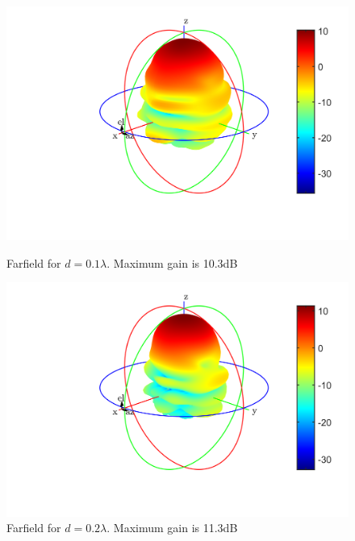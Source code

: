 \begin{figure}[H]
  \centering
  \begin{minipage}[b]{0.5\textwidth}
	\includegraphics[scale = 0.5]{figures/measurement/antennas/array_4_0p1.png}
	\caption{Farfield for $d = 0.1\lambda$. Maximum gain is 10.3dB}
    \label{fig:chamber_four_ant_ff_01}
  \end{minipage}
  \hfill
  \begin{minipage}[b]{0.4\textwidth}
\includegraphics[scale = 0.5]{figures/measurement/antennas/array_4_0p2.png}
\caption{Farfield for $d = 0.2\lambda$. Maximum gain is 11.3dB}
    \label{fig:chamber_four_ant_ff:02}
  \end{minipage}
\end{figure}

